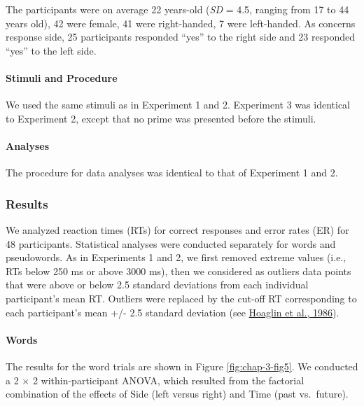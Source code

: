 \documentclass[
  a4paper,12pt,twoside,onecolumn,openright,final,oldfontcommands]{memoir}
\begin{document}
The participants were on average 22 years-old (\emph{SD} = 4.5, ranging from 17 to 44 years old), 42 were female, 41 were right-handed, 7 were left-handed. As concerns response side, 25 participants responded ``yes'' to the right side and 23 responded ``yes'' to the left side.

\hypertarget{stimuli-and-procedure}{%
\paragraph{Stimuli and Procedure}\label{stimuli-and-procedure}}

We used the same stimuli as in Experiment 1 and 2. Experiment 3 was identical to Experiment 2, except that no prime was presented before the stimuli.

\hypertarget{analyses-1}{%
\paragraph{Analyses}\label{analyses-1}}

The procedure for data analyses was identical to that of Experiment 1 and 2.

\hypertarget{results-2}{%
\subsubsection{Results}\label{results-2}}

We analyzed reaction times (RTs) for correct responses and error rates (ER) for 48 participants. Statistical analyses were conducted separately for words and pseudowords. As in Experiments 1 and 2, we first removed extreme values (i.e., RTs below 250 ms or above 3000 ms), then we considered as outliers data points that were above or below 2.5 standard deviations from each individual participant's mean RT. Outliers were replaced by the cut-off RT corresponding to each participant's mean +/- 2.5 standard deviation (see \protect\hyperlink{ref-hoaglin_performance_1986}{Hoaglin et al., 1986}).

\hypertarget{words-2}{%
\paragraph{Words}\label{words-2}}

The results for the word trials are shown in Figure \ref{fig:chap-3-fig5}. We conducted a 2 × 2 within-participant ANOVA, which resulted from the factorial combination of the effects of Side (left versus right) and Time (past vs.~future).
\end{document}
